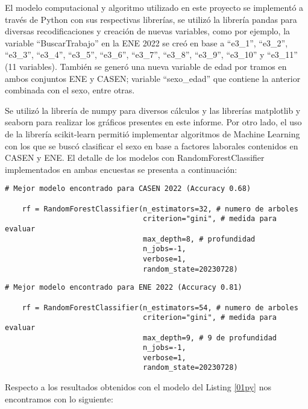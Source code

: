 El modelo computacional y algoritmo utilizado en este proyecto se implementó a través de Python con sus respectivas librerías, se utilizó la librería pandas para diversas recodificaciones y creación de nuevas variables, como por ejemplo, la variable ``BuscarTrabajo'' en la ENE 2022 se creó en base a ``e3\_1'', ``e3\_2'', ``e3\_3'', ``e3\_4'', ``e3\_5'', ``e3\_6'', ``e3\_7'', ``e3\_8'', ``e3\_9'', ``e3\_10'' y ``e3\_11'' (11 variables). También se generó una nueva variable de edad por tramos en ambos conjuntos ENE y CASEN; variable ``sexo\_edad'' que contiene la anterior combinada con el sexo, entre otras.

Se utilizó la librería de numpy para diversos cálculos y las librerías matplotlib y seaborn para realizar los gráficos presentes en este informe. Por otro lado, el uso de la librería scikit-learn permitió implementar algoritmos de Machine Learning con los que se buscó clasificar el sexo en base a factores laborales contenidos en CASEN y ENE. El detalle de los modelos con RandomForestClassifier implementados en ambas encuestas se presenta a continuación:

\FloatBarrier

\begin{lstlisting}[style=mystyle, caption={Modelo RandomForestClassifier en CASEN 2022}, label={01py}]
	# Mejor modelo encontrado para CASEN 2022 (Accuracy 0.68)
		
	rf = RandomForestClassifier(n_estimators=32, # numero de arboles
								criterion="gini", # medida para evaluar
								max_depth=8, # profundidad
								n_jobs=-1,
								verbose=1,
								random_state=20230728)
\end{lstlisting}

\FloatBarrier

\begin{lstlisting}[style=mystyle, caption={Modelo RandomForestClassifier en ENE 2022}, label={02py}]
	# Mejor modelo encontrado para ENE 2022 (Accuracy 0.81)
		
	rf = RandomForestClassifier(n_estimators=54, # numero de arboles
								criterion="gini", # medida para evaluar
								max_depth=9, # 9 de profundidad
								n_jobs=-1,
								verbose=1,
								random_state=20230728)
\end{lstlisting}


\FloatBarrier

Respecto a los resultados obtenidos con el modelo del Listing \ref{01py} nos encontramos con lo siguiente: 


